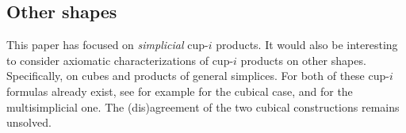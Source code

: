 \subsection{Other shapes}

This paper has focused on \textit{simplicial} cup-$i$ products.
It would also be interesting to consider axiomatic characterizations of cup-$i$ products on other shapes.
Specifically, on cubes and products of general simplices.
For both of these cup-$i$ formulas already exist, see for example \cite{pilarczyk2016cubical,medina2022cube_einfty} for the cubical case, and \cite{medina2023multisimplicial} for the multisimplicial one.
The (dis)agreement of the two cubical constructions remains unsolved.

